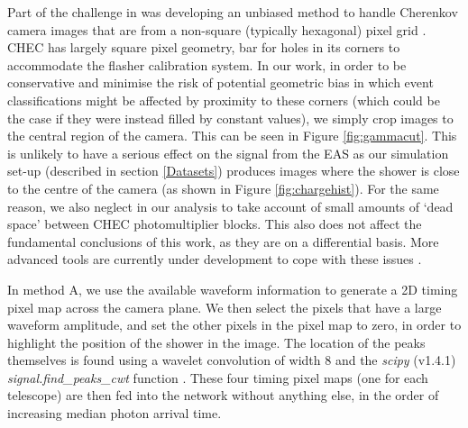 \begin{table}[ht]
    \centering
    \caption{Summary of methods used. The ordering of input channels into the ConvLSTM2D networks is as presented in this table. The number of trainable parameters is also shown, highlighting the effect of using a different number of channels in method B.}
    \label{table:methods}
\end{table}
Part of the challenge in \cite{Shilon} was developing an unbiased method to handle Cherenkov camera images that are from a non-square (typically hexagonal) pixel grid \cite{Hexagdly}.  CHEC has largely square pixel geometry, bar for holes in its corners to accommodate the flasher calibration system. In our work, in order to be conservative and minimise the risk of potential geometric bias in which event classifications might be affected by proximity to these corners (which could be the case if they were instead filled by constant values), we simply crop images to the central region of the camera. This can be seen in Figure \ref{fig:gammacut}. This is unlikely to have a serious effect on the signal from the EAS as our simulation set-up (described in section \ref{Datasets}) produces images where the shower is close to the centre of the camera (as shown in Figure \ref{fig:chargehist}). For the same reason, we also neglect in our analysis to take account of small amounts of `dead space' between CHEC photomultiplier blocks. This also does not affect the fundamental conclusions of this work, as they are on a differential basis. More advanced tools are currently under development to cope with these issues \cite{dl1dh} \cite{thomas}.

In method A, we use the available waveform information to generate a 2D timing pixel map across the camera plane. We then select the pixels that have a large waveform amplitude, and set the other pixels in the pixel map to zero, in order to highlight the position of the shower in the image. The location of the peaks themselves is found using a wavelet convolution of width 8 and the \textit{scipy} (v1.4.1) \textit{signal.find\_peaks\_cwt} function \cite{scipy}\cite{findpeaks}. These four timing pixel maps (one for each telescope) are then fed into the network without anything else, in the order of increasing median photon arrival time.

